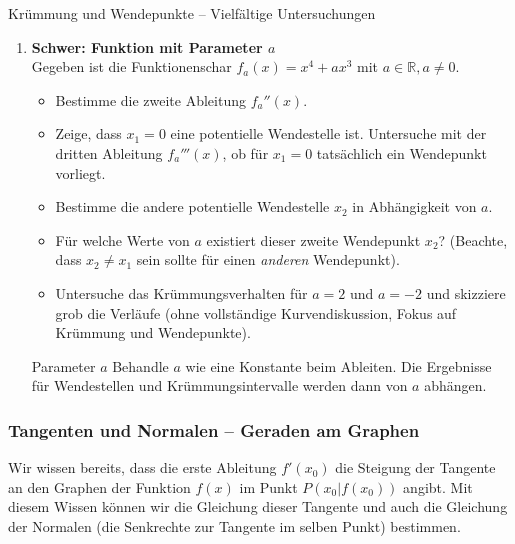 \begin{aufgabenumgebung}{Krümmung und Wendepunkte – Vielfältige Untersuchungen}
\begin{enumerate}
    \item \textbf{Schwer: Funktion mit Parameter $a$} \\
        Gegeben ist die Funktionenschar $f_a(x) = x^4 + ax^3$ mit $a \in \mathbb{R}, a \neq 0$.
        \begin{itemize}
            \item Bestimme die zweite Ableitung $f_a''(x)$.
            \item Zeige, dass $x_1=0$ eine potentielle Wendestelle ist. Untersuche mit der dritten Ableitung $f_a'''(x)$, ob für $x_1=0$ tatsächlich ein Wendepunkt vorliegt.
            \item Bestimme die andere potentielle Wendestelle $x_2$ in Abhängigkeit von $a$.
            \item Für welche Werte von $a$ existiert dieser zweite Wendepunkt $x_2$? (Beachte, dass $x_2 \neq x_1$ sein sollte für einen \textit{anderen} Wendepunkt).
            \item Untersuche das Krümmungsverhalten für $a=2$ und $a=-2$ und skizziere grob die Verläufe (ohne vollständige Kurvendiskussion, Fokus auf Krümmung und Wendepunkte).
        \end{itemize}
        \begin{tippumgebung}{Parameter $a$}
        Behandle $a$ wie eine Konstante beim Ableiten. Die Ergebnisse für Wendestellen und Krümmungsintervalle werden dann von $a$ abhängen.
        \end{tippumgebung}
\end{enumerate}
\end{aufgabenumgebung}


\subsubsection{Tangenten und Normalen – Geraden am Graphen}
\label{subsubsec:tangenten_normalen}

Wir wissen bereits, dass die erste Ableitung $f'(x_0)$ die Steigung der Tangente an den Graphen der Funktion $f(x)$ im Punkt $P(x_0|f(x_0))$ angibt. Mit diesem Wissen können wir die Gleichung dieser Tangente und auch die Gleichung der Normalen (die Senkrechte zur Tangente im selben Punkt) bestimmen.

